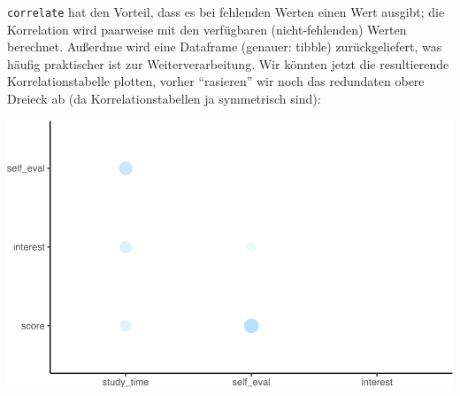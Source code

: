 \documentclass[12pt,ngerman,]{book}
\newenvironment{Shaded}{\begin{snugshade}}{\end{snugshade}}
\newcommand{\KeywordTok}[1]{\textcolor[rgb]{0.13,0.29,0.53}{\textbf{{#1}}}}
\newcommand{\StringTok}[1]{\textcolor[rgb]{0.31,0.60,0.02}{{#1}}}
\newcommand{\CommentTok}[1]{\textcolor[rgb]{0.56,0.35,0.01}{\textit{{#1}}}}
\newcommand{\NormalTok}[1]{{#1}}
\renewenvironment{Shaded}{\begin{kframe}}{\end{kframe}}
\begin{document}
\begin{Shaded}
\end{Shaded}

\texttt{correlate} hat den Vorteil, dass es bei fehlenden Werten einen
Wert ausgibt; die Korrelation wird paarweise mit den verfügbaren
(nicht-fehlenden) Werten berechnet. Außerdme wird eine Dataframe
(genauer: tibble) zurückgeliefert, was häufig praktischer ist zur
Weiterverarbeitung. Wir könnten jetzt die resultierende
Korrelationstabelle plotten, vorher ``rasieren'' wir noch das redundaten
obere Dreieck ab (da Korrelationstabellen ja symmetrisch sind):

\begin{Shaded}
\end{Shaded}

\begin{center}\includegraphics[width=0.7\linewidth]{043_Typische_Probleme_Datenanalyse_files/figure-latex/rplot-demo-1} \end{center}
\end{document}
